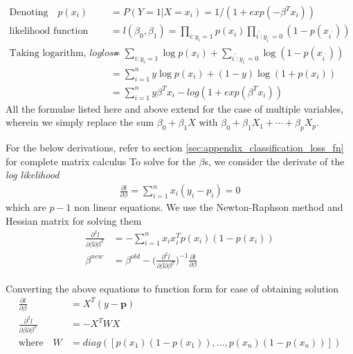 \documentclass[../statistical_learning_notes.tex]{subfiles}
\begin{document}
    \begin{align*}
        \text{Denoting} \quad p(x_{i}) &= P(Y = 1 | X = x_{i}) = 1/(1 + exp(-\beta^{T}x_{i}))\\
        \text{likelihood function} &= l(\beta_{0},\beta_{1}) = \prod_{i:y_{i}=1} p(x_{i}) \prod_{i^{'}:y_{i^{'}}=0}(1-p(x_{i^{'}}))\\
        \text{Taking logarithm, } logloss &= \sum_{i:y_{i}=1} \log p(x_{i}) + \sum_{i^{'}:y_{i^{'}}=0}\log (1-p(x_{i^{'}}))\\
        &= \sum_{i=1}^{n} y\log p(x_{i}) + (1-y)\log (1+p(x_{i})) \tag*{since $y = 0$ or $1$}\\
        &= \sum_{i=1}^{n} y\beta^{T}x_{i} - log(1 + exp(\beta^{T}x_{i}))
    \end{align*}
    All the formulae listed here and above extend for the case of multiple variables, wherein we simply replace the sum $\beta_{0} + \beta_{1}X$ with $\beta_{0} + \beta_{1}X_{1} + \cdots + \beta_{p}X_{p}$.\newline

    For the below derivations, refer to section \ref{sec:appendix_classification_loss_fn} for complete matrix calculus
    To solve for the $\beta$s, we consider the derivate of the \emph{log likelihood}
    \begin{align*}
        \frac{\partial l}{\partial \beta} = \sum_{i=1}^{n} x_{i}(y_{i} - p_{i}) = 0
    \end{align*}
    which are $p-1$ non linear equations. We use the Newton-Raphson method and Hessian matrix for solving them
    \begin{align*}
        \frac{\partial^{2}l}{\partial \beta \partial \beta^{T}} &= -\sum_{i=1}^{n} x_{i}x_{i}^{T}p(x_{i})(1 - p(x_{i}))\\
        \beta^{new} &= \beta^{old} - \bigg( \frac{\partial^{2}l}{\partial \beta \partial \beta^{T}} \bigg)^{-1} \frac{\partial l}{\partial \beta}
    \end{align*}

    Converting the above equations to function form for ease of obtaining solution
    \begin{align*}
        \frac{\partial l}{\partial \beta} &= X^{T}(y - \mathbf{p})\\
        \frac{\partial^{2}l}{\partial \beta \partial \beta^{T}} &= -X^{T}WX\\
        \text{where} \quad W &= diag([p(x_{1})(1-p(x_{1})), \ldots, p(x_{n})(1-p(x_{n}))])
    \end{align*}
\end{document}

